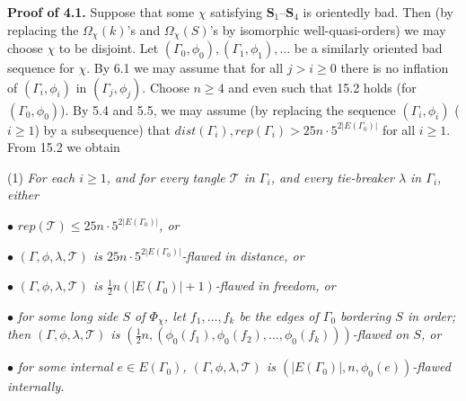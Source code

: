 \textbf{Proof of 4.1.} Suppose that some $\chi$ satisfying $\mathbf{S}_1\text{--}\mathbf{S}_4$ is orientedly bad. Then (by replacing the $\Omega_\chi(k)$'s and $\Omega_\chi(S)$'s by isomorphic well-quasi-orders) we may choose $\chi$ to be disjoint. Let $(\Gamma_0, \phi_0), (\Gamma_1, \phi_1), \dots$ be a similarly oriented bad sequence for $\chi$. By 6.1 we may assume that for all $j > i \ge 0$ there is no inflation of $(\Gamma_i, \phi_i)$ in $(\Gamma_j, \phi_j)$. Choose $n \ge 4$ and even such that 15.2 holds (for $(\Gamma_0, \phi_0)$). By 5.4 and 5.5, we may assume (by replacing the sequence $(\Gamma_i, \phi_i)$ ($i \ge 1$) by a subsequence) that $dist(\Gamma_i), rep(\Gamma_i) > 25n \cdot 5^{2|E(\Gamma_0)|}$ for all $i \ge 1$. From 15.2 we obtain

\hspace*{12pt}(1) \textit{For each $i \ge 1$, and for every tangle $\mathscr{T}$ in $\Gamma_i$, and every tie-breaker $\lambda$ in $\Gamma_i$, either}

\hspace*{12pt}$\bullet$ \textit{$rep(\mathscr{T}) \le 25n \cdot 5^{2|E(\Gamma_0)|}$, or}

\hspace*{12pt}$\bullet$ \textit{$(\Gamma, \phi, \lambda, \mathscr{T})$ is $25n \cdot 5^{2|E(\Gamma_0)|}$-flawed in distance, or}

\hspace*{12pt}$\bullet$ \textit{$(\Gamma, \phi, \lambda, \mathscr{T})$ is $\frac{1}{2}n(|E(\Gamma_0)| + 1)$-flawed in freedom, or}

\hspace*{12pt}$\bullet$ \textit{for some long side $S$ of $\Phi_\chi$, let $f_1, \dots, f_k$ be the edges of $\Gamma_0$ bordering $S$ in order; then $(\Gamma, \phi, \lambda, \mathscr{T})$ is $(\frac{1}{2}n, (\phi_0(f_1), \phi_0(f_2), \dots, \phi_0(f_k)))$-flawed on $S$, or}

\hspace*{12pt}$\bullet$ \textit{for some internal $e \in E(\Gamma_0)$, $(\Gamma, \phi, \lambda, \mathscr{T})$ is $(|E(\Gamma_0)|, n, \phi_0(e))$-flawed internally.}

